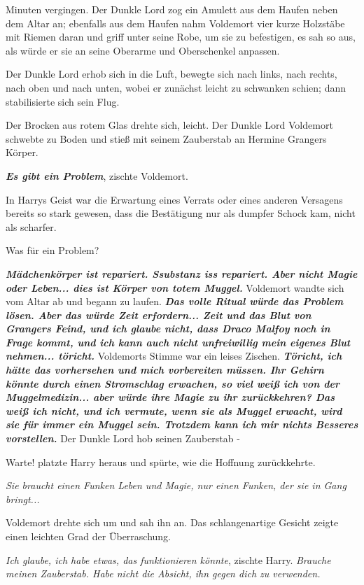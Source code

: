 Minuten vergingen. Der Dunkle Lord zog ein Amulett aus dem Haufen neben dem
Altar an; ebenfalls aus dem Haufen nahm Voldemort vier kurze Holzstäbe mit
Riemen daran und griff unter seine Robe, um sie zu befestigen, es sah so aus,
als würde er sie an seine Oberarme und Oberschenkel anpassen.

Der Dunkle Lord erhob sich in die Luft, bewegte sich nach links, nach rechts,
nach oben und nach unten, wobei er zunächst leicht zu schwanken schien; dann
stabilisierte sich sein Flug.

Der Brocken aus rotem Glas drehte sich, leicht. Der Dunkle Lord Voldemort
schwebte zu Boden und stieß mit seinem Zauberstab an Hermine Grangers Körper.

\glqq{}\textbf{\emph{Es gibt ein Problem}}\grqq{}, zischte Voldemort.

In Harrys Geist war die Erwartung eines Verrats oder eines anderen Versagens
bereits so stark gewesen, dass die Bestätigung nur als dumpfer Schock kam, nicht
als scharfer.

\glqq{}Was für ein Problem?\grqq{}

\glqq{}\textbf{\emph{Mädchenkörper ist repariert. Ssubstanz iss repariert. Aber
nicht Magie oder Leben... dies ist Körper von totem Muggel.}}\grqq{} Voldemort wandte
sich vom Altar ab und begann zu laufen. \glqq{}\textbf{\emph{Das volle Ritual
würde das Problem lösen. Aber das würde Zeit erfordern... Zeit und das Blut von
Grangers Feind, und ich glaube nicht, dass Draco Malfoy noch in Frage kommt, und
ich kann auch nicht unfreiwillig mein eigenes Blut nehmen... töricht.}}\grqq{}
Voldemorts Stimme war ein leises Zischen. \glqq{}\textbf{\emph{Töricht, ich hätte
das vorhersehen und mich vorbereiten müssen. Ihr Gehirn könnte durch einen
Stromschlag erwachen, so viel weiß ich von der Muggelmedizin... aber würde ihre
Magie zu ihr zurückkehren? Das weiß ich nicht, und ich vermute, wenn sie als
Muggel erwacht, wird sie für immer ein Muggel sein. Trotzdem kann ich mir nichts
Besseres vorstellen.}}\grqq{} Der Dunkle Lord hob seinen Zauberstab -

\glqq{}Warte!\grqq{} platzte Harry heraus und spürte, wie die Hoffnung
zurückkehrte.

\emph{Sie braucht einen Funken Leben und Magie, nur einen Funken, der sie in
Gang bringt...}

Voldemort drehte sich um und sah ihn an. Das schlangenartige Gesicht zeigte
einen leichten Grad der Überraschung.

\glqq{}\emph{Ich glaube, ich habe etwas, das funktionieren könnte}\grqq{},
zischte Harry. \glqq{}\emph{Brauche meinen Zauberstab. Habe nicht die Absicht,
ihn gegen dich zu verwenden.}\grqq{}

